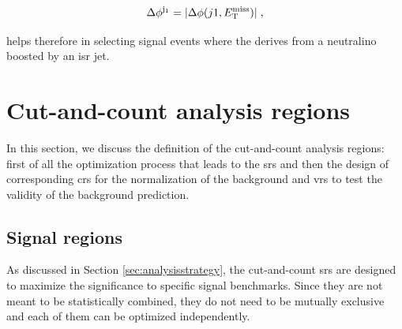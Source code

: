 \begin{equation}
{\Delta}\phi^{\mathrm{j}_1} = |{\Delta}{\phi}(j1, E_{\rm T}^{\mathrm{miss}})| \; ,
\end{equation}

\noindent helps therefore in selecting signal events where the \met derives from a neutralino boosted by an \gls{isr} jet. 



\section{Cut-and-count analysis regions}

In this section, we discuss the definition of the cut-and-count analysis regions: 
first of all the optimization process that leads to the \glspl{sr} and then the 
design of corresponding \glspl{cr} for the normalization of the \ttbar background and 
\glspl{vr} to test the validity of the background prediction.

\subsection*{Signal regions}

As discussed in Section \ref{sec:analysisstrategy}, the cut-and-count \glspl{sr} are designed to maximize the significance to specific 
signal benchmarks. 
Since they are not meant to be statistically combined, they do not need to be mutually exclusive and each of them can be optimized independently.


